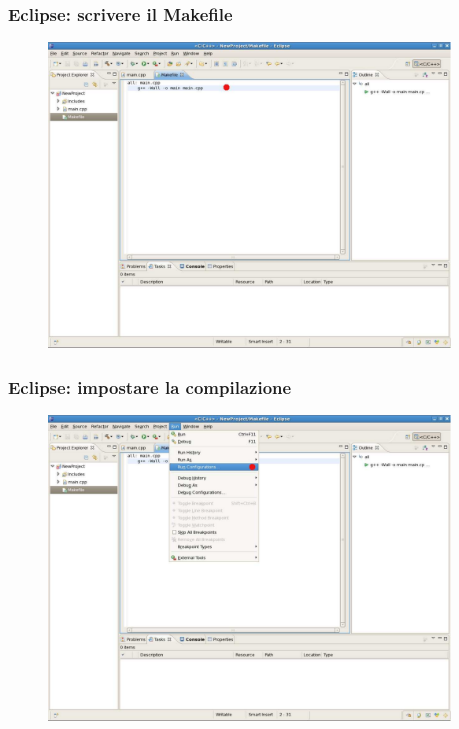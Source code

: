 \documentclass{beamer}
\begin{document}

\begin{frame}[fragile]

    \frametitle{Eclipse: scrivere il Makefile}

    \begin{figure}
        \centering
        \includegraphics[width=0.95\textwidth]{./images/eclipse8}
    \end{figure}

\end{frame}


\begin{frame}[fragile]

    \frametitle{Eclipse: impostare la compilazione}

    \begin{figure}
        \centering
        \includegraphics[width=0.95\textwidth]{./images/eclipse9}
    \end{figure}

\end{frame}
\end{document}
